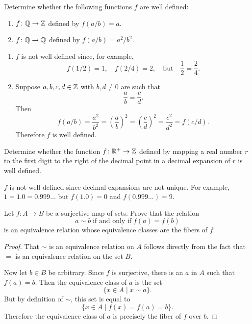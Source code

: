  Determine whether the following functions $f$ are well
defined:
\begin{enumerate}
\item
  $f\colon\mathbb{Q}\to\mathbb{Z}$ defined by $f(a/b) = a$.

\item
  $f\colon\mathbb{Q}\to\mathbb{Q}$ defined by $f(a/b) = a^2/b^2$.
\end{enumerate}
\begin{solution}
  \begin{enumerate}
  \item
    $f$ is not well defined since, for example,
    \begin{equation*}
      f(1/2) = 1, \quad f(2/4) = 2, \quad\text{but}\quad\frac12 = \frac24.
    \end{equation*}

  \item
    Suppose $a,b,c,d\in\mathbb{Z}$ with $b, d\neq 0$ are such that
    \begin{equation*}
      \frac{a}{b} = \frac{c}{d}.
    \end{equation*}
    Then
    \begin{equation*}
      f(a/b) = \frac{a^2}{b^2} = \left(\frac ab\right)^2
      = \left(\frac cd\right)^2 = \frac{c^2}{d^2} = f(c/d).
    \end{equation*}
    Therefore $f$ is well defined. \qedhere
  \end{enumerate}
\end{solution}

 Determine whether the function $f\colon\mathbb{R}^+\to\mathbb{Z}$ defined
by mapping a real number $r$ to the first digit to the right of the
decimal point in a decimal expansion of $r$ is well defined.
\begin{solution}
  $f$ is not well defined since decimal expansions are not unique. For
  example, $1 = 1.0 = 0.999\ldots$ but $f(1.0) = 0$ and
  $f(0.999\ldots) = 9$.
\end{solution}

 Let $f\colon A\to B$ be a surjective map of sets. Prove
that the relation
\begin{equation*}
  a\sim b \;\text{if and only if}\; f(a) = f(b)
\end{equation*}
is an equivalence relation whose equivalence classes are the fibers of
$f$.
\begin{proof}
  That $\sim$ is an equivalence relation on $A$ follows directly from
  the fact that $=$ is an equivalence relation on the set $B$.

  Now let $b\in B$ be arbitrary. Since $f$ is surjective, there is an
  $a$ in $A$ such that $f(a) = b$. Then the equivalence class of $a$
  is the set
  \begin{equation*}
    \{ x\in A \mid x\sim a \}.
  \end{equation*}
  But by definition of $\sim$, this set is equal to
  \begin{equation*}
    \{ x\in A \mid f(x) = f(a) = b \}.
  \end{equation*}
  Therefore the equivalence class of $a$ is precisely the fiber of $f$
  over $b$.
\end{proof}
